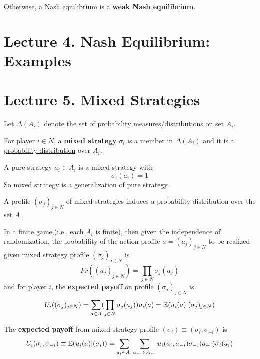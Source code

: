 \documentclass[11pt]{article}
\begin{document}
		\begin{definition}[lec.3]
			Otherwise, a Nash equilibrium is a \textbf{weak Nash equilibrium}.
		\end{definition}

	\section{Lecture 4. Nash Equilibrium: Examples}
	\section{Lecture 5. Mixed Strategies}
		\begin{notation}[pg.32]
			Let $\Delta(A_i)$ denote the \ul{set of probability measures/distributions} on set $A_i$.
		\end{notation}
		\begin{definition}[lec.5]
			For player $i \in N$, a \textbf{mixed strategy} $\sigma_i$ is a member in $\Delta(A_i)$ and it is a \ul{probability distribution} over $A_i$.
		\end{definition}
		
		\begin{remark}[lec.5]
			A pure strategy $a_i \in A_i$ is a mixed strategy with 
			\[
				\sigma_i(a_i) = 1
			\]
			So mixed strategy is a generalization of pure strategy.
		\end{remark}
		
		\begin{definition}[pg.32]
			A profile $(\sigma_j)_{j\in N}$ of mixed strategies induces a probability distribution over the set $A$.
		\end{definition}
		
		\begin{proposition}[pg.32]
			In a finite game,(i.e., each $A_i$ is finite), then given the independence of randomization, the probability of the action profile $a = (a_j)_{j \in N}$ to be realized given mixed strategy profile $(\sigma_j)_{j\in N}$ is
			\[
				Pr((a_j)_{j \in N}) = \prod_{j \in N} \sigma_j(a_j)
			\]
			and for player $i$, the \textbf{expected payoff} on profile $(\sigma_j)_{j\in N}$ is 
			\[
				U_i((\sigma_{j})_{j \in N}) = \sum_{a \in A} (\prod_{j \in N} \sigma_j(a_j)) u_i(a) = \mathbb{E}({u_i(a)|(\sigma_j)_{j \in N}})
			\]
		\end{proposition}
		
		\begin{proposition}
			The \textbf{expected payoff} from mixed strategy profile $(\sigma_i) \equiv (\sigma_i, \sigma_{-i})$ is
			\[
				U_i(\sigma_i, \sigma_{-i}) \equiv \mathbb{E}({u_i(a)|(\sigma_i)}) = \sum_{a_i \in A_i} \sum_{a_{-i} \in A_{-i}} u_i(a_i, a_{-i}) \sigma_{-i}(a_{-i}) \sigma_i(a_i)
			\]
		\end{proposition}
		
\end{document}
